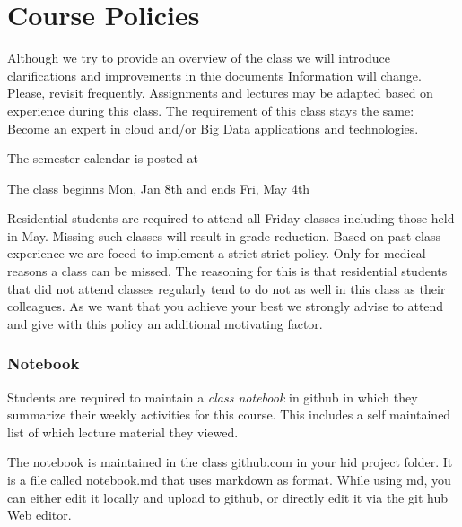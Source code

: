 
\chapter{Course Policies}\label{C:course-2018}

\FILENAME

\begin{WARNING}
  Although we try to provide an overview of the class we will
  introduce clarifications and improvements in thie documents
  Information will change. Please, revisit frequently. Assignments and
  lectures may be adapted based on experience during this class. The
  requirement of this class stays the same: Become an expert in cloud
  and/or Big Data applications and  technologies.
\end{WARNING}

\begin{IU}

The semester calendar is posted at 


The class beginns Mon, Jan 8th and ends Fri, May 4th

\end{IU}

Residential students are required to attend all Friday classes
including those held in May.  Missing such classes will result in
grade reduction. Based on past class experience we are foced to
implement a strict strict policy. Only for medical reasons a class can
be missed. The reasoning for this is that residential students that
did not attend classes regularly tend to do not as well in this class
as their colleagues. As we want that you achieve your best we strongly
advise to attend and give with this policy an additional motivating
factor.

\subsection{Notebook}\label{notebook}

Students are required to maintain a \emph{class notebook} in github in
which they summarize their weekly activities for this course. This
includes a self maintained list of which lecture material they viewed.

The notebook is maintained in the class github.com in your hid project
folder. It is a file called notebook.md that uses markdown as format.
While using md, you can either edit it locally and upload to github, or
directly edit it via the git hub Web editor.

